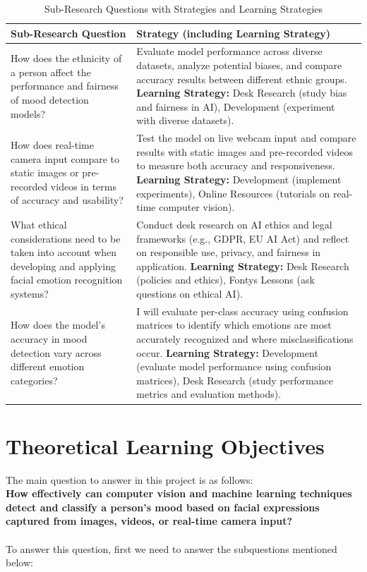 \documentclass[12pt,a4paper]{article}
\begin{document}
\begin{table}[h!]
\centering
\begin{tabular}{|p{7cm}|p{8cm}|}
\hline
\textbf{Sub-Research Question} & \textbf{Strategy (including Learning Strategy)} \\ \hline

How does the ethnicity of a person affect the performance and fairness of mood detection models? & 
Evaluate model performance across diverse datasets, analyze potential biases, and compare accuracy results between different ethnic groups. 
\textbf{Learning Strategy:} Desk Research (study bias and fairness in AI), Development (experiment with diverse datasets). \\ \hline

How does real-time camera input compare to static images or pre-recorded videos in terms of accuracy and usability? & 
Test the model on live webcam input and compare results with static images and pre-recorded videos to measure both accuracy and responsiveness.  
\textbf{Learning Strategy:} Development (implement experiments), Online Resources (tutorials on real-time computer vision). \\ \hline

What ethical considerations need to be taken into account when developing and applying facial emotion recognition systems? & 
Conduct desk research on AI ethics and legal frameworks (e.g., GDPR, EU AI Act) and reflect on responsible use, privacy, and fairness in application.  
\textbf{Learning Strategy:} Desk Research (policies and ethics), Fontys Lessons (ask questions on ethical AI). \\ \hline

How does the model’s accuracy in mood detection vary across different emotion categories? & 
I will evaluate per-class accuracy using confusion matrices to identify which emotions are most accurately recognized and where misclassifications occur.  
\textbf{Learning Strategy:} Development (evaluate model performance using confusion matrices), Desk Research (study performance metrics and evaluation methods). \\ \hline

\end{tabular}
\caption{Sub-Research Questions with Strategies and Learning Strategies}
\label{tab:subquestions}
\end{table}
\clearpage  
\section{Theoretical Learning Objectives}
The main question to answer in this project is as follows: \\
\textbf{How effectively can computer vision and machine learning techniques detect and classify
a person’s mood based on facial expressions captured from images, videos, or real-time
camera input?} \\\\
To answer this question, first we need to answer the subquestions mentioned below:
\end{document}
